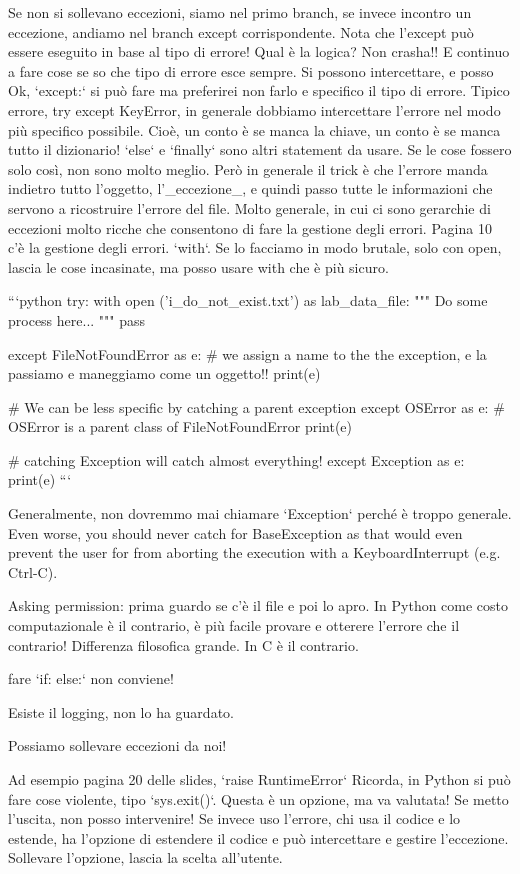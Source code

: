 \documentclass[10pt, a4paper, twosided, titlepage, draft]{book}
\begin{document}
Se non si sollevano eccezioni, siamo nel primo branch, se invece incontro un eccezione, andiamo nel branch except corrispondente. 
Nota che l'except può essere eseguito in base al tipo di errore!
Qual è la logica? Non crasha!! E continuo a fare cose se so che tipo di errore esce sempre.
Si possono intercettare, e posso
Ok, `except:` si può fare ma preferirei non farlo e specifico il tipo di errore.
Tipico errore, try except KeyError, in generale dobbiamo intercettare l'errore nel modo più specifico possibile.
Cioè, un conto è se manca la chiave, un conto è se manca tutto il dizionario!
`else` e `finally` sono altri statement da usare.
Se le cose fossero solo così, non sono molto meglio. Però in generale il trick è che l'errore manda indietro tutto l'oggetto, l'_eccezione_, e quindi passo tutte le informazioni che servono a ricostruire l'errore del file.
Molto generale, in cui ci sono gerarchie di eccezioni molto ricche che consentono di fare la gestione degli errori.
Pagina 10 c'è la gestione degli errori.
`with`. Se lo facciamo in modo brutale, solo con open, lascia le cose incasinate, ma posso usare with che è più sicuro.

```python
try:
with open (’i_do_not_exist.txt’) as lab_data_file:
""" Do some process here...
"""
pass

except FileNotFoundError as e: # we assign a name to the the exception, e la passiamo e maneggiamo come un oggetto!!
print(e)

# We can be less specific by catching a parent exception
except OSError as e: # OSError is a parent class of FileNotFoundError
print(e)

# catching Exception will catch almost everything!
except Exception as e:
print(e)
```

Generalmente, non dovremmo mai chiamare `Exception` perché è troppo generale.
Even worse, you should never catch for BaseException as that would even prevent the user for from aborting the execution with a KeyboardInterrupt (e.g. Ctrl-C).

Asking permission: prima guardo se c'è il file e poi lo apro. In Python come costo computazionale è il contrario, è più facile provare e otterere l'errore che il contrario! Differenza filosofica grande. In C è il contrario.

fare `if: else:` non conviene!

Esiste il logging, non lo ha guardato.

Possiamo sollevare eccezioni da noi!

Ad esempio pagina 20 delle slides, `raise RuntimeError`
Ricorda, in Python si può fare cose violente, tipo `sys.exit()`. Questa è un opzione, ma va valutata! Se metto l'uscita, non posso intervenire! Se invece uso l'errore, chi usa il codice e lo estende, ha l'opzione di estendere il codice e può intercettare e gestire l'eccezione. Sollevare l'opzione, lascia la scelta all'utente.
\end{document}
